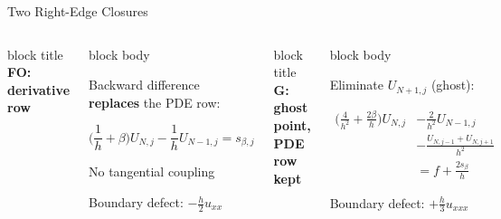 \documentclass[aspectratio=43]{beamer}
\newcommand{\bb}[1]{{\color{rblue}\bfseries #1}}
\begin{document}
\begin{frame}{Two Right-Edge Closures}

\begin{columns}[T,onlytextwidth]


\begin{beamercolorbox}[wd=\linewidth,rounded=true,sep=3pt]{block title}
\small\textbf{FO: derivative row}
\end{beamercolorbox}

\begin{beamercolorbox}[wd=\linewidth,rounded=true,sep=4pt]{block body}
\begin{minipage}[t][3.85cm][t]{\linewidth}
\footnotesize

Backward difference \bb{replaces} the PDE row:

\[
\Big(\frac1h+\beta\Big)U_{N,j}
-\frac1h U_{N-1,j}=s_{\beta,j}
\]

\vfill

{\small No tangential coupling}

\vspace{0.1cm}

Boundary defect:
\(\displaystyle -\frac h2u_{xx}\)

\end{minipage}
\end{beamercolorbox}


\begin{beamercolorbox}[wd=\linewidth,rounded=true,sep=3pt]{block title}
\small\textbf{G: ghost point, PDE row kept}
\end{beamercolorbox}

\begin{beamercolorbox}[wd=\linewidth,rounded=true,sep=4pt]{block body}
\begin{minipage}[t][3.85cm][t]{\linewidth}
\footnotesize

Eliminate \(U_{N+1,j}\) (ghost):

\[
\begin{aligned}
\Big(\frac4{h^2}+\frac{2\beta}{h}\Big)U_{N,j}
&-\frac2{h^2}U_{N-1,j}\\[-2pt]
&-\frac{U_{N,j-1}+U_{N,j+1}}{h^2}\\[-2pt]
&=f+\frac{2s_\beta}{h}
\end{aligned}
\]

\vfill

Boundary defect:
\(\displaystyle +\frac h3u_{xxx}\)


\end{minipage}
\end{beamercolorbox}
\end{columns}
\end{frame}
\end{document}
